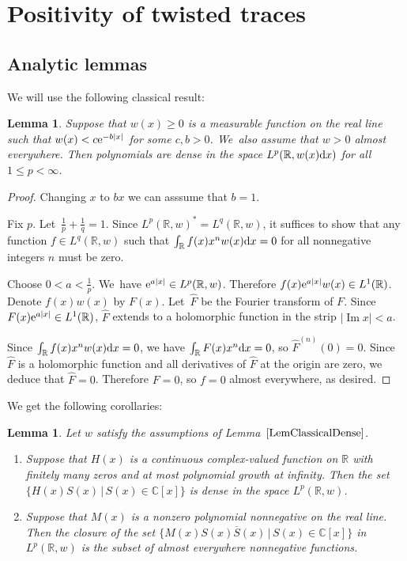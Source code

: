 \documentclass[pdftex]{sigma}
\newcommand{\RN}{\mathbb{R}} %
\newcommand{\CN}{\mathbb{C}} %
\newcommand{\ovl}{\overline}
\renewcommand{\Im}{\mathop{\mathrm{Im}}\nolimits}
\newtheorem{Lemma}[Theorem]{Lemma}
\theoremstyle{definition}
\numberwithin{equation}{section}
\begin{document}
\section{Positivity of twisted traces}\label{sec4}

\subsection{Analytic lemmas}
We will use the following classical result:
\begin{Lemma}
\label{LemClassicalDense}
Suppose that $w(x)\ge 0$ is a measurable function on the real line such that $w(x)<c {\rm e}^{-b|x|}$ for some $c,b>0$. We~also assume that $w>0$ almost everywhere. Then polynomials are dense in the space $L^p(\RN,w(x){\rm d}x)$ for all $1\leq p<\infty$.
\end{Lemma}
\begin{proof}
Changing $x$ to $bx$ we can asssume that $b=1$.

Fix $p$. Let~$\frac{1}{p}+\frac{1}{q}=1$. Since $L^p(\RN,w)^*=L^q(\RN,w)$, it suffices to show that any function $f\in L^q(\RN,w)$ such that $\int_{\RN} f(x)x^n w(x){\rm d}x=0$ for all nonnegative integers $n$ must be zero.

Choose $0<a<\frac{1}{p}$. We~have ${\rm e}^{a|x|}\in L^p(\RN,w)$. Therefore $f(x){\rm e}^{a|x|}w(x)\in L^1(\RN)$. Denote $f(x)w(x)$ by $F(x)$. Let~$\widehat{F}$ be the Fourier transform of $F$. Since $F(x){\rm e}^{a|x|}\in L^1(\RN)$, $\widehat{F}$ extends to a holomorphic function in the strip $|\Im x|<a$.

Since $\int_{\RN}f(x)x^n w(x){\rm d}x=0$, we have $\int_{\RN}F(x)x^n{\rm d}x=0$, so $\widehat{F}^{(n)}(0)=0$. Since $\widehat{F}$ is a holomorphic function and all derivatives of $\widehat{F}$ at the origin are zero, we deduce that $\widehat{F}=0$. Therefore $F=0$, so $f=0$ almost everywhere, as desired.
\end{proof}
We get the following corollaries:
\begin{Lemma}\label{CorClassical}
Let $w$ satisfy the assumptions of Lemma~$\ref{LemClassicalDense}$.
\begin{enumerate}\itemsep=0pt
\item[$1.$]
Suppose that $H(x)$ is a continuous complex-valued function on $\mathbb R$ with finitely many zeros and at most polynomial growth at infinity. Then the set $\{H(x)S(x)\,|\, S(x)\in\CN[x]\}$ is dense in the space $L^p(\RN,w)$.
\item[$2.$]
Suppose that $M(x)$ is a nonzero polynomial nonnegative on the real line. Then the closure of the set $\{M(x)S(x)\ovl{S}(x)\,|\, S(x)\in \CN[x]\}$ in $L^p(\RN,w)$ is the subset of almost everywhere nonnegative functions.
\end{enumerate}
\end{Lemma}
\end{document}
